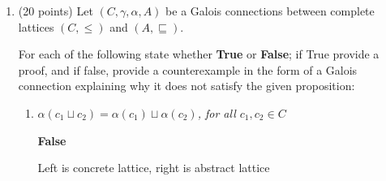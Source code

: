 \documentclass[12pt]{article}
\begin{document}
\begin{enumerate}
\begin{mdframed}
\end{mdframed}
\newpage

\item  (20 points) 
Let $(C, \gamma, \alpha, A)$ be a Galois connections between complete lattices 
$(C, \leq)$ and $(A, \sqsubseteq)$.

For each of the following state whether \textbf{True} or \textbf{False}; 
if True provide a proof, and if false, provide a counterexample in the form 
of a Galois connection explaining why it does not satisfy the given proposition: 



\begin{enumerate}
  \item 
 \emph{$\alpha ( c_1 \sqcup c_2 ) = \alpha(c_1) \sqcup \alpha(c_2)$, for all $c_1, c_2 \in C$}
 \begin{mdframed}


    \textbf{False}

    Left is concrete lattice, right is abstract lattice



\end{mdframed}
\end{enumerate}
\end{enumerate}
\end{document}

